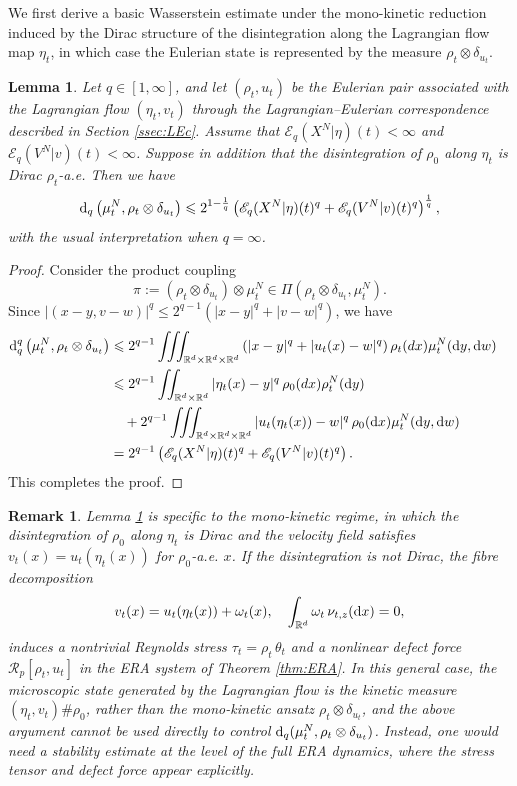 \documentclass[10pt,reqno]{amsart}
\renewcommand{\le}{\leqslant}
\numberwithin{equation}{section}
\newtheorem{lemma}{Lemma}[section]
\newtheorem{remark}{Remark}[section]
\newcommand{\R}{\mathbb R}
\newcommand{\lt}{\left}
\newcommand{\rt}{\right}
\newcommand{\intr}{\int_{\R^d}}
\newcommand{\intrr}{\iint_{\R^d \times \R^d}}
\newcommand{\calR}{\mathcal R}
\newcommand{\rd}{\textnormal{d}}
\newcommand{\dx}{\textnormal{d}x}
\newcommand{\dy}{\textnormal{d}y}
\newcommand{\dw}{\textnormal{d}w}
\begin{document}
We first derive a basic Wasserstein estimate under the mono-kinetic reduction induced by the Dirac structure of the disintegration along the Lagrangian flow map $\eta_t$, in which case the Eulerian state is represented by the measure $\rho_t\otimes\delta_{u_t}$.

\begin{lemma}\label{lem:d_pZ_p}
Let $q \in [1,\infty]$, and let $(\rho_t,u_t)$ be the Eulerian pair associated with the Lagrangian flow $(\eta_t,v_t)$ through the Lagrangian--Eulerian correspondence described in Section \ref{ssec:LEc}. Assume that $\mathscr{E}_q(X^N|\eta)(t) < \infty$ and $\mathscr{E}_q(V^N|v)(t) < \infty$.   Suppose in addition that the disintegration of $\rho_0$ along $\eta_t$ is Dirac $\rho_t$-a.e.  Then we have
\[
{\rd}_q \lt(\mu_t^N, \rho_t\otimes\delta_{u_t}\rt)  \le 2^{1 - \frac1q}\lt(\mathscr{E}_q(X^N|\eta)(t)^q+\mathscr{E}_q(V^N|v)(t)^q\rt)^{\frac1q},
\]
with the usual interpretation when $q=\infty$.
\end{lemma}
\begin{proof}
Consider the product coupling
\[
\pi := (\rho_t\otimes\delta_{u_t})\otimes\mu_t^N \in \Pi(\rho_t\otimes\delta_{u_t},\mu_t^N).
\]
Since $|(x-y,v-w)|^q \le 2^{q-1}(|x-y|^q+|v-w|^q)$, we have
\begin{align*}
{\rd}_q^q \lt(\mu_t^N, \rho_t\otimes\delta_{u_t}\rt)
&\le 2^{q-1}\iiint_{\R^d \times \R^d \times \R^d} \lt(|x-y|^q+|u_t(x)-w|^q\rt) \rho_t(dx)\mu_t^N(\dy,\dw)\cr
&\le 2^{q-1}\intrr |\eta_t(x)-y|^q \,\rho_0(dx)\rho_t^N(\dy) \cr
&\quad + 2^{q-1}\iiint_{\R^d \times \R^d \times \R^d} |u_t(\eta_t(x))-w|^q\, \rho_0(\dx)\mu_t^N(\dy,\dw)\cr
& = 2^{q-1}\lt(\mathscr{E}_q(X^N|\eta)(t)^q + \mathscr{E}_q(V^N|v)(t)^q\rt).
\end{align*}
This completes the proof.
\end{proof}

\begin{remark}
Lemma \ref{lem:d_pZ_p} is specific to the mono-kinetic regime, in which the
disintegration of $\rho_0$ along $\eta_t$ is Dirac and the velocity field satisfies $v_t(x)=u_t(\eta_t(x))$ for $\rho_0$-a.e.  $x$. If the disintegration is not Dirac, the fibre decomposition
\[
v_t(x)=u_t(\eta_t(x))+\omega_t(x), \quad  \intr \omega_t\,\nu_{t,z}(\dx)=0,
\]
induces a nontrivial Reynolds stress $\tau_t=\rho_t\,\theta_t$ and a nonlinear defect force $\calR_p[\rho_t,u_t]$ in the ERA system of Theorem \ref{thm:ERA}. In this general case, the microscopic state generated by the Lagrangian flow is the kinetic measure $(\eta_t,v_t)\#\rho_0$, rather than the mono-kinetic ansatz $\rho_t\otimes\delta_{u_t}$, and the above argument cannot be used directly to control $\rd_q(\mu_t^N,\rho_t\otimes \delta_{u_t})$. Instead, one would need a stability estimate at the level of the full ERA dynamics, where the stress tensor and defect force appear explicitly.
\end{remark}
\end{document}
